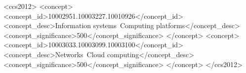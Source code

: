 \documentclass[sigconf]{acmart}
\begin{document}
\begin{CCSXML}
<ccs2012>
<concept>
<concept_id>10002951.10003227.10010926</concept_id>
<concept_desc>Information systems~Computing platforms</concept_desc>
<concept_significance>500</concept_significance>
</concept>
<concept>
<concept_id>10003033.10003099.10003100</concept_id>
<concept_desc>Networks~Cloud computing</concept_desc>
<concept_significance>500</concept_significance>
</concept>
</ccs2012>
\end{CCSXML}





\maketitle




 
\end{document}
